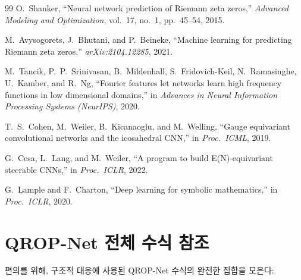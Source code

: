 \documentclass[11pt, a4paper]{article}
\theoremstyle{definition}
\theoremstyle{plain}
\begin{document}
\begin{thebibliography}{99}
O.~Shanker,
``Neural network prediction of Riemann zeta zeros,''
\textit{Advanced Modeling and Optimization}, vol.~17, no.~1, pp.~45--54,
2015.

M.~Avysogorets, J.~Bhutani, and P.~Beineke,
``Machine learning for predicting Riemann zeta zeros,''
\textit{arXiv:2104.12285}, 2021.

M.~Tancik, P.~P.~Srinivasan, B.~Mildenhall, S.~Fridovich-Keil,
N.~Ramasinghe, U.~Kamber, and R.~Ng,
``Fourier features let networks learn high frequency functions in low
dimensional domains,''
in \textit{Advances in Neural Information Processing Systems (NeurIPS)},
2020.

T.~S.~Cohen, M.~Weiler, B.~Kicanaoglu, and M.~Welling,
``Gauge equivariant convolutional networks and the icosahedral CNN,''
in \textit{Proc.\ ICML}, 2019.

G.~Cesa, L.~Lang, and M.~Weiler,
``A program to build E(N)-equivariant steerable CNNs,''
in \textit{Proc.\ ICLR}, 2022.

G.~Lample and F.~Charton,
``Deep learning for symbolic mathematics,''
in \textit{Proc.\ ICLR}, 2020.

\end{thebibliography}


\appendix

\section{QROP-Net 전체 수식 참조}
\label{app:qropnet_eqs}

편의를 위해, 구조적 대응에 사용된 QROP-Net 수식의 완전한 집합을 모은다:
\end{document}
